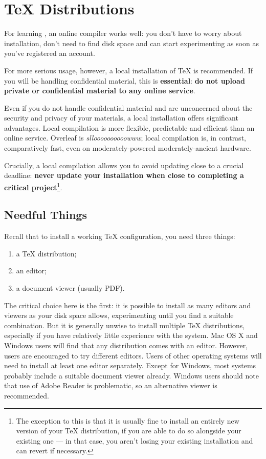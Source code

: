 \clearpage
\appendix

\section<1-| beamer:0>{\TeX{} Distributions}\label{sec:tex-distros}

For learning \LaTeXe{}, an online compiler works well: you don't have to worry about installation, don't need to find disk space and can start experimenting as soon as you've registered an account.

For more serious usage, however, a local installation of \TeX{} is recommended.
If you will be handling confidential material, this is \textbf{essential}: \textbf{do not upload private or confidential material to any online service}.

Even if you do not handle confidential material and are unconcerned about the security and privacy of your materials, a local installation offers significant advantages.
Local compilation is more flexible, predictable and efficient than an online service.
Overleaf is \emph{slloooooooooowww}; local compilation is, in contrast, comparatively fast, even on moderately-powered moderately-ancient hardware.

Crucially, a local compilation allows you to avoid updating close to a crucial deadline: \textbf{never update your installation when close to completing a critical project}\footnote{%
  The exception to this is that it is usually fine to install an entirely new version of your \TeX{} distribution, if you are able to do so alongside your existing one --- in that case, you aren't losing your existing installation and can revert if necessary.}.

\subsection<1-| beamer:0>{Needful Things}\label{subsec:needful}

Recall that to install a working \TeX{} configuration, you need three things:
\begin{enumerate}
  \item a \TeX{} distribution;
  \item an editor;
  \item a document viewer (usually PDF).
\end{enumerate}
The critical choice here is the first: it is possible to install as many editors and viewers as your disk space allows, experimenting until you find a suitable combination.
But it is generally unwise to install multiple \TeX{} distributions, especially if you have relatively little experience with the system.
Mac OS X and Windows users will find that any distribution comes with an editor.
However, users are encouraged to try different editors.
Users of other operating systems will need to install at least one editor separately.
Except for Windows, most systems probably include a suitable document viewer already.
Windows users should note that use of Adobe Reader is problematic, so an alternative viewer is recommended.
\bigskip

